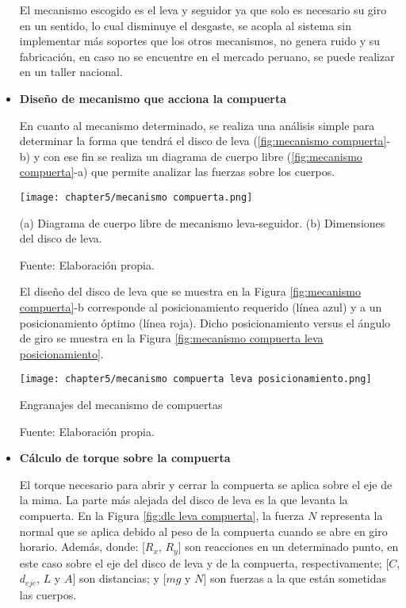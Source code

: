 \begin{itemize}
	El mecanismo escogido es el leva y seguidor ya que solo es necesario su giro en un sentido, lo cual disminuye el desgaste, se acopla al sistema sin implementar más soportes que los otros mecanismos, no genera ruido y su fabricación, en caso no se encuentre en el mercado peruano, se puede realizar en un taller nacional.  	
	
	\item \textbf{Diseño de mecanismo que acciona la compuerta}
	
	En cuanto al mecanismo determinado, se realiza una análisis simple para determinar la forma que tendrá el disco de leva (\ref{fig:mecanismo compuerta}-b) y con ese fin se realiza un diagrama de cuerpo libre (\ref{fig:mecanismo compuerta}-a) que permite analizar las fuerzas sobre los cuerpos.
	
	\begin{myfigure}[H]
		\centering
		\texttt{[image: chapter5/mecanismo compuerta.png]}
		\caption[Mecanismo leva-seguidor]{(a) Diagrama de cuerpo libre de mecanismo leva-seguidor. (b) Dimensiones del disco de leva.}
		\begin{myflushleftportland}
			Fuente: Elaboración propia.
		\end{myflushleftportland}
		\label{fig:mecanismo compuerta}
	\end{myfigure}
	
	El diseño del disco de leva que se muestra en la Figura \ref{fig:mecanismo compuerta}-b corresponde al posicionamiento requerido (línea azul) y a un posicionamiento óptimo (línea roja). Dicho posicionamiento versus el ángulo de giro se muestra en la Figura \ref{fig:mecanismo compuerta leva posicionamiento}. 
	
	\begin{myfigure}[H]
		\centering
		\texttt{[image: chapter5/mecanismo compuerta leva posicionamiento.png]}
		\caption{Engranajes del mecanismo de compuertas}
		\begin{myflushleftportland}
			Fuente: Elaboración propia.
		\end{myflushleftportland}
		\label{fig:mecanismo compuerta leva posicionamiento}
	\end{myfigure}
	
	\item \textbf{Cálculo de torque sobre la compuerta}
		
	El torque necesario para abrir y cerrar la compuerta se aplica sobre el eje de la mima. La parte más alejada del disco de leva es la que levanta la compuerta. En la Figura \ref{fig:dlc leva compuerta}, la fuerza $N$ representa la normal que se aplica debido al peso de la compuerta cuando se abre en giro horario. Además, donde: [$R_x$, $R_y$] son reacciones en un determinado punto, en este caso sobre el eje del disco de leva y de la compuerta, respectivamente; [$C$, $d_{eje}$, $L$ y $A$] son distancias; y [$mg$ y $N$] son fuerzas a la que están sometidas las cuerpos.
	

\end{itemize}
